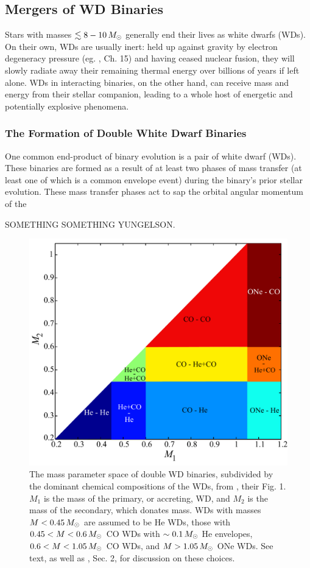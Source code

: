 
\subsection{Mergers of WD Binaries}
\label{ssec:c1_wdmergers_sub}

Stars with masses $\lesssim8-10\,\Msun$ generally end their lives as white dwarfs (WDs).  On their own, WDs are usually inert: held up against gravity by electron degeneracy pressure (eg. \cite{kippww12}, Ch. 15) and having ceased nuclear fusion, they will slowly radiate away their remaining thermal energy over billions of years if left alone.  WDs in interacting binaries, on the other hand, can receive mass and energy from their stellar companion, leading to a whole host of energetic and potentially explosive phenomena.

\subsubsection{The Formation of Double White Dwarf Binaries}

One common end-product of binary evolution is a pair of white dwarf (WDs).    These binaries are formed as a result of at least two phases of mass transfer (at least one of which is a common envelope event) during the binary's prior stellar evolution.  These mass transfer phases act to sap the orbital angular momentum of the 


{\charles SOMETHING SOMETHING YUNGELSON.}

\begin{figure}
\centering
\includegraphics[width=0.6\hsize]{introduction/figures/dan+12_wdbinmass.pdf}
\caption{The mass parameter space of double WD binaries, subdivided by the dominant chemical compositions of the WDs, from \cite{dan+12}, their Fig. 1.  $M_1$ is the mass of the primary, or accreting, WD, and $M_2$ is the mass of the secondary, which donates mass.  WDs with masses $M<0.45\,\Msun$ are assumed to be He WDs, those with $0.45 < M < 0.6\,\Msun$ CO WDs with $\sim0.1\,\Msun$ He envelopes, $0.6 < M < 1.05\,\Msun$ CO WDs, and $M>1.05\,\Msun$ ONe WDs.  See text, as well as \cite{dan+12}, Sec. 2, for discussion on these choices.}
\label{fig:c1_wdbinarymasses}
\end{figure}

